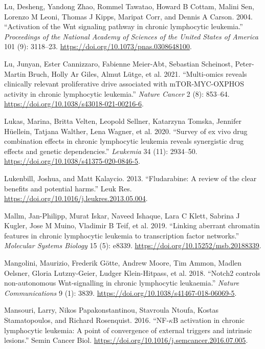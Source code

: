 \documentclass[11pt, a4paper, twosided]{book}
\newenvironment{CSLReferences}%
  {}%
  {\par}
\begin{document}
\begin{CSLReferences}{1}{0}
\leavevmode{}%
Lu, Desheng, Yandong Zhao, Rommel Tawatao, Howard B Cottam, Malini Sen, Lorenzo M Leoni, Thomas J Kipps, Maripat Corr, and Dennis A Carson. 2004. {``{Activation of the Wnt signaling pathway in chronic lymphocytic leukemia}.''} \emph{Proceedings of the National Academy of Sciences of the United States of America} 101 (9): 3118--23. \url{https://doi.org/10.1073/pnas.0308648100}.

\leavevmode{}%
Lu, Junyan, Ester Cannizzaro, Fabienne Meier-Abt, Sebastian Scheinost, Peter-Martin Bruch, Holly Ar Giles, Almut Lütge, et al. 2021. {``{Multi-omics reveals clinically relevant proliferative drive associated with mTOR-MYC-OXPHOS activity in chronic lymphocytic leukemia.}''} \emph{Nature Cancer} 2 (8): 853--64. \url{https://doi.org/10.1038/s43018-021-00216-6}.

\leavevmode{}%
Lukas, Marina, Britta Velten, Leopold Sellner, Katarzyna Tomska, Jennifer Hüellein, Tatjana Walther, Lena Wagner, et al. 2020. {``{Survey of ex vivo drug combination effects in chronic lymphocytic leukemia reveals synergistic drug effects and genetic dependencies}.''} \emph{Leukemia} 34 (11): 2934--50. \url{https://doi.org/10.1038/s41375-020-0846-5}.

\leavevmode{}%
Lukenbill, Joshua, and Matt Kalaycio. 2013. {``{Fludarabine: A review of the clear benefits and potential harms}.''} Leuk Res. \url{https://doi.org/10.1016/j.leukres.2013.05.004}.

\leavevmode{}%
Mallm, Jan-Philipp, Murat Iskar, Naveed Ishaque, Lara C Klett, Sabrina J Kugler, Jose M Muino, Vladimir B Teif, et al. 2019. {``{Linking aberrant chromatin features in chronic lymphocytic leukemia to transcription factor networks.}''} \emph{Molecular Systems Biology} 15 (5): e8339. \url{https://doi.org/10.15252/msb.20188339}.

\leavevmode{}%
Mangolini, Maurizio, Frederik Götte, Andrew Moore, Tim Ammon, Madlen Oelsner, Gloria Lutzny-Geier, Ludger Klein-Hitpass, et al. 2018. {``{Notch2 controls non-autonomous Wnt-signalling in chronic lymphocytic leukaemia}.''} \emph{Nature Communications} 9 (1): 3839. \url{https://doi.org/10.1038/s41467-018-06069-5}.

\leavevmode{}%
Mansouri, Larry, Nikos Papakonstantinou, Stavroula Ntoufa, Kostas Stamatopoulos, and Richard Rosenquist. 2016. {``{NF-\(\kappa\)B activation in chronic lymphocytic leukemia: A point of convergence of external triggers and intrinsic lesions}.''} Semin Cancer Biol. \url{https://doi.org/10.1016/j.semcancer.2016.07.005}.


\end{CSLReferences}
\end{document}
